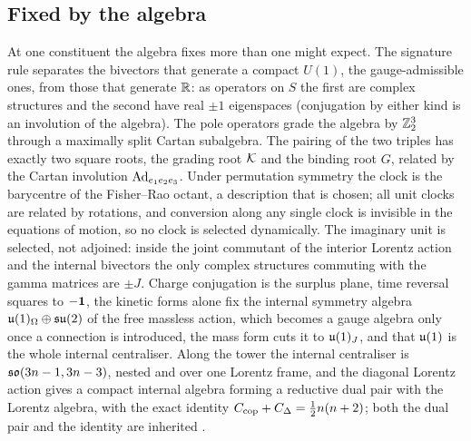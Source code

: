\subsection{Fixed by the algebra}

At one constituent the algebra fixes more than one might expect. The signature rule separates the bivectors that generate a compact $U(1)$, the gauge-admissible ones, from those that
generate $\mathbb{R}$: as operators on $S$ the first are complex structures and the second have real $\pm1$ eigenspaces (conjugation by either kind is an
involution of the algebra). The
pole operators grade the algebra by $\mathbb{Z}_2^3$ through a maximally split Cartan subalgebra. The pairing of the two triples has exactly two square roots, the grading root
$\mathcal K$ and the binding root $G$, related by the Cartan involution $\operatorname{Ad}_{e_1e_2e_3}$. Under permutation symmetry the clock is the barycentre of the Fisher--Rao octant, a description that is chosen; all unit clocks are related
by rotations, and conversion along any single clock is invisible in the equations of motion, so no clock is selected dynamically. The imaginary unit is selected, not adjoined: inside the joint commutant of the interior
Lorentz action and the internal bivectors the only complex structures commuting with the gamma matrices are $\pm J$. Charge conjugation is the surplus plane, time reversal
squares to $-\mathbf 1$, the kinetic forms alone fix the internal symmetry algebra $\mathfrak{u}(1)_\Omega\oplus\mathfrak{su}(2)$ of the free massless action, which becomes a gauge algebra only once a
connection is introduced, the mass form cuts it to $\mathfrak{u}(1)_J$, and that $\mathfrak{u}(1)$ is the whole internal
centraliser. Along the tower the internal centraliser is $\mathfrak{so}(3n-1,3n-3)$, nested and over one Lorentz frame, and the diagonal Lorentz action gives a compact internal algebra
forming a reductive dual pair with the Lorentz algebra, with the exact identity $C_{\rm cop}+C_\Delta=\tfrac12n(n+2)$; both the dual pair and the identity
are inherited \cite{Howe89,Neergard19}.

